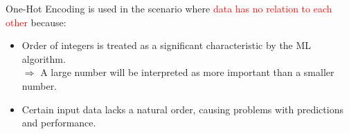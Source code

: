 \documentclass{book}
\begin{document}
One-Hot Encoding is used in the scenario where \textcolor{red}{data has no relation to each other} because:\\
\begin{itemize}
    \item Order of integers is treated as a significant characteristic by the ML algorithm.\\
    $\Rightarrow$ A large number will be interpreted as more important than a smaller number.
    \item Certain input data lacks a natural order, causing problems with predictions and performance.
\end{itemize}
\\
\end{document}
